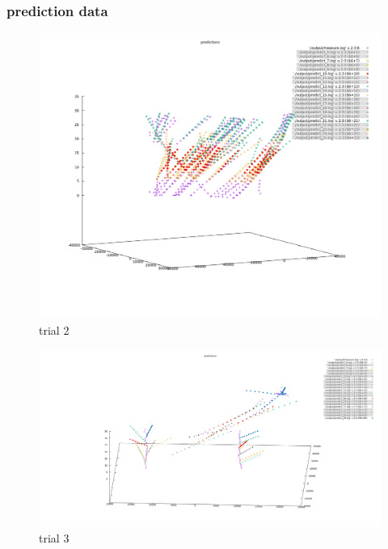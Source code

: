 \documentclass[10pt,a4paper]{article}
\begin{document}
\subsubsection{prediction data}
\begin{figure}[H]
\caption{trial 2} 
\includegraphics[width=\textwidth]{../graphs/prediction_data_2.png}
\end{figure}
\begin{figure}[H]
\caption{trial 3} 
\includegraphics[width=\textwidth]{../graphs/prediction_data_3.png}
\end{figure}
\end{document}
